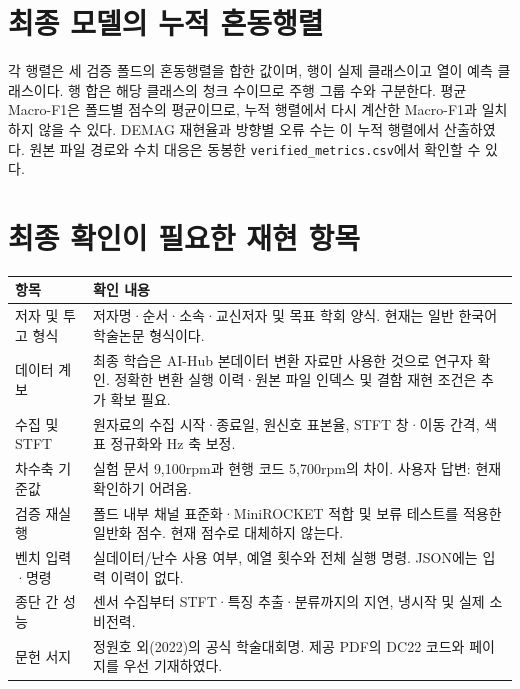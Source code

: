 \documentclass[11pt,a4paper]{article}
\newcommand{\smalltable}[1]{\begingroup\small\setlength{\tabcolsep}{5pt}\endgroup}
\begin{document}
\clearpage
\appendix
\section{최종 모델의 누적 혼동행렬}\label{app:cm}
각 행렬은 세 검증 폴드의 혼동행렬을 합한 값이며, 행이 실제 클래스이고 열이 예측 클래스이다.
행 합은 해당 클래스의 청크 수이므로 주행 그룹 수와 구분한다.
평균 Macro-F1은 폴드별 점수의 평균이므로, 누적 행렬에서 다시 계산한 Macro-F1과 일치하지 않을 수 있다.
DEMAG 재현율과 방향별 오류 수는 이 누적 행렬에서 산출하였다.
원본 파일 경로와 수치 대응은 동봉한 \texttt{verified\_metrics.csv}에서 확인할 수 있다.

\begin{table}[htbp]\centering\caption{IONIQ: 최종 87채널 누적 혼동행렬.}\smalltable{cm_ioniq.tex}\end{table}
\begin{table}[htbp]\centering\caption{KONA: 최종 87채널 누적 혼동행렬.}\smalltable{cm_kona.tex}\end{table}
\begin{table}[htbp]\centering\caption{NIRO: 최종 87채널 누적 혼동행렬.}\smalltable{cm_niro.tex}\end{table}

\clearpage
\section{최종 확인이 필요한 재현 항목}
\begin{longtable}{p{35mm}p{110mm}}
\toprule 항목 & 확인 내용\\\midrule
저자 및 투고 형식 & 저자명·순서·소속·교신저자 및 목표 학회 양식. 현재는 일반 한국어 학술논문 형식이다.\\
데이터 계보 & 최종 학습은 AI-Hub 본데이터 변환 자료만 사용한 것으로 연구자 확인. 정확한 변환 실행 이력·원본 파일 인덱스 및 결함 재현 조건은 추가 확보 필요.\\
수집 및 STFT & 원자료의 수집 시작·종료일, 원신호 표본율, STFT 창·이동 간격, 색표 정규화와 Hz 축 보정.\\
차수축 기준값 & 실험 문서 9,100rpm과 현행 코드 5,700rpm의 차이. 사용자 답변: 현재 확인하기 어려움.\\
검증 재실행 & 폴드 내부 채널 표준화·MiniROCKET 적합 및 보류 테스트를 적용한 일반화 점수. 현재 점수로 대체하지 않는다.\\
벤치 입력·명령 & 실데이터/난수 사용 여부, 예열 횟수와 전체 실행 명령. JSON에는 입력 이력이 없다.\\
종단 간 성능 & 센서 수집부터 STFT·특징 추출·분류까지의 지연, 냉시작 및 실제 소비전력.\\
문헌 서지 & 정원호 외(2022)의 공식 학술대회명. 제공 PDF의 DC22 코드와 페이지를 우선 기재하였다.\\
\bottomrule
\end{longtable}
\end{document}
